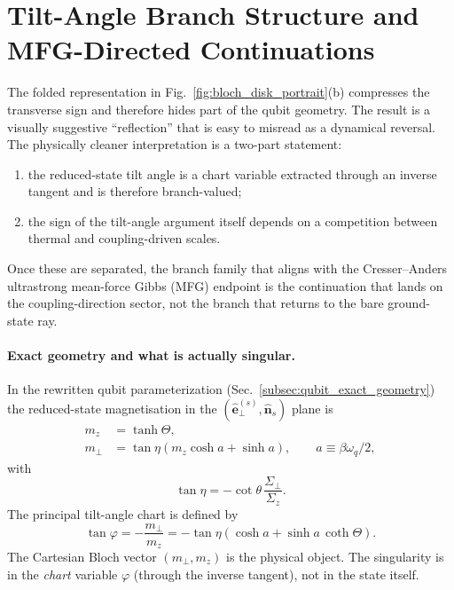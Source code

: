 \section{Tilt-Angle Branch Structure and MFG-Directed Continuations}
\label{app:tilt_sign_branch_mfg_alignment}

The folded representation in Fig.~\ref{fig:bloch_disk_portrait}(b) compresses the transverse sign and
therefore hides part of the qubit geometry.  The result is a visually suggestive ``reflection'' that is easy to
misread as a dynamical reversal.  The physically cleaner interpretation is a two-part statement:
\begin{enumerate}
    \item the reduced-state tilt angle is a chart variable extracted through an inverse tangent and is therefore
    branch-valued;
    \item the sign of the tilt-angle argument itself depends on a competition between thermal and coupling-driven
    scales.
\end{enumerate}
Once these are separated, the branch family that aligns with the Cresser--Anders ultrastrong mean-force Gibbs
(MFG) endpoint is the continuation that lands on the coupling-direction sector, not the branch that returns to the
bare ground-state ray.

\paragraph{Exact geometry and what is actually singular.}
In the rewritten qubit parameterization (Sec.~\ref{subsec:qubit_exact_geometry}) the reduced-state magnetisation
in the $(\hat{\mathbf e}_{\perp}^{(s)},\hat{\mathbf n}_s)$ plane is
\begin{align}
    m_z &= \tanh\Theta,
    \\
    m_\perp &= \tan\eta\left(m_z\cosh a+\sinh a\right),
    \qquad a\equiv \beta\omega_q/2,
    \label{eq:tilt_sign_branch_mz_mperp}
\end{align}
with
\begin{equation}
    \tan\eta=-\cot\theta\,\frac{\Sigma_\perp}{\Sigma_z}.
    \label{eq:tilt_sign_branch_taneta}
\end{equation}
The principal tilt-angle chart is defined by
\begin{equation}
    \tan\varphi
    =-\frac{m_\perp}{m_z}
    =-\tan\eta\left(\cosh a+\sinh a\,\coth\Theta\right).
    \label{eq:tilt_sign_branch_tanphi}
\end{equation}
The Cartesian Bloch vector $(m_\perp,m_z)$ is the physical object.  The singularity is in the \emph{chart}
variable $\varphi$ (through the inverse tangent), not in the state itself.

